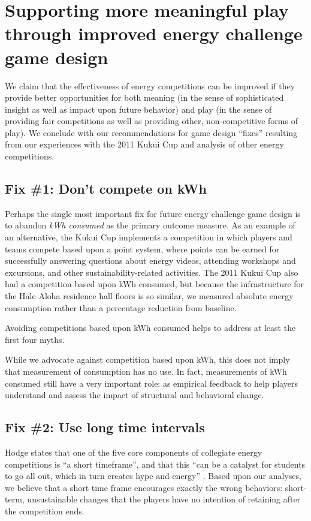 \documentclass[jou]{apa} %
\begin{document}
\section{Supporting more meaningful play through improved energy challenge game design}

We claim that the effectiveness of energy competitions can be improved if they provide
better opportunities for both meaning (in the sense of sophisticated insight as well as
impact upon future behavior) and play (in the sense of providing fair competitions as well
as providing other, non-competitive forms of play). We conclude with our recommendations
for game design ``fixes'' resulting from our experiences with the 2011 Kukui Cup and
analysis of other energy competitions.

\subsection{Fix \#1: Don't compete on kWh}

Perhaps the single most important fix for future energy challenge game design is to
abandon {\em kWh consumed} as the primary outcome measure.  As an example of an 
alternative, the Kukui Cup implements a competition in which players and teams compete
based upon a point system, where points can be earned for successfully answering questions
about energy videos, attending workshops and excursions, and other sustainability-related
activities.  The 2011 Kukui Cup also had a competition based upon kWh consumed, but
because the infrastructure for the Hale Aloha residence hall floors is so similar, we
measured absolute energy consumption rather than a percentage reduction from baseline.

Avoiding competitions based upon kWh consumed helps to address at least the first four myths.

While we advocate against competition based upon kWh, this does not imply that measurement
of consumption has no use.  In fact, measurements of kWh consumed still have a very important role:
as empirical feedback to help players understand and assess the impact of structural and
behavioral change.

\subsection{Fix \#2: Use long time intervals}

Hodge states that one of the five core components of collegiate energy competitions is
``a short timeframe'', and that this ``can be a catalyst for students to go all out, which
in turn creates hype and energy'' \cite{Hodge2010}.   Based upon our analyses, we believe
that a short time frame encourages exactly the wrong behaviors:  short-term, unsustainable
changes that the players have no intention of retaining after the competition ends.  
\end{document}
